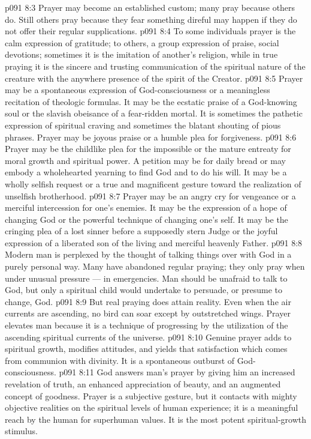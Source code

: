 \vs p091 8:3 \pc Prayer may become an established custom; many pray because others do. Still others pray because they fear something direful may happen if they do not offer their regular supplications.
\vs p091 8:4 To some individuals prayer is the calm expression of gratitude; to others, a group expression of praise, social devotions; sometimes it is the imitation of another’s religion, while in true praying it is the sincere and trusting communication of the spiritual nature of the creature with the anywhere presence of the spirit of the Creator.
\vs p091 8:5 Prayer may be a spontaneous expression of God\hyp{}consciousness or a meaningless recitation of theologic formulas. It may be the ecstatic praise of a God\hyp{}knowing soul or the slavish obeisance of a fear\hyp{}ridden mortal. It is sometimes the pathetic expression of spiritual craving and sometimes the blatant shouting of pious phrases. Prayer may be joyous praise or a humble plea for forgiveness.
\vs p091 8:6 Prayer may be the childlike plea for the impossible or the mature entreaty for moral growth and spiritual power. A petition may be for daily bread or may embody a wholehearted yearning to find God and to do his will. It may be a wholly selfish request or a true and magnificent gesture toward the realization of unselfish brotherhood.
\vs p091 8:7 Prayer may be an angry cry for vengeance or a merciful intercession for one’s enemies. It may be the expression of a hope of changing God or the powerful technique of changing one’s self. It may be the cringing plea of a lost sinner before a supposedly stern Judge or the joyful expression of a liberated son of the living and merciful heavenly Father.
\vs p091 8:8 \pc Modern man is perplexed by the thought of talking things over with God in a purely personal way. Many have abandoned regular praying; they only pray when under unusual pressure --- in emergencies. Man should be unafraid to talk to God, but only a spiritual child would undertake to persuade, or presume to change, God.
\vs p091 8:9 \pc But real praying does attain reality. Even when the air currents are ascending, no bird can soar except by outstretched wings. Prayer elevates man because it is a technique of progressing by the utilization of the ascending spiritual currents of the universe.
\vs p091 8:10 Genuine prayer adds to spiritual growth, modifies attitudes, and yields that satisfaction which comes from communion with divinity. It is a spontaneous outburst of God\hyp{}consciousness.
\vs p091 8:11 God answers man’s prayer by giving him an increased revelation of truth, an enhanced appreciation of beauty, and an augmented concept of goodness. Prayer is a subjective gesture, but it contacts with mighty objective realities on the spiritual levels of human experience; it is a meaningful reach by the human for superhuman values. It is the most potent spiritual\hyp{}growth stimulus.
